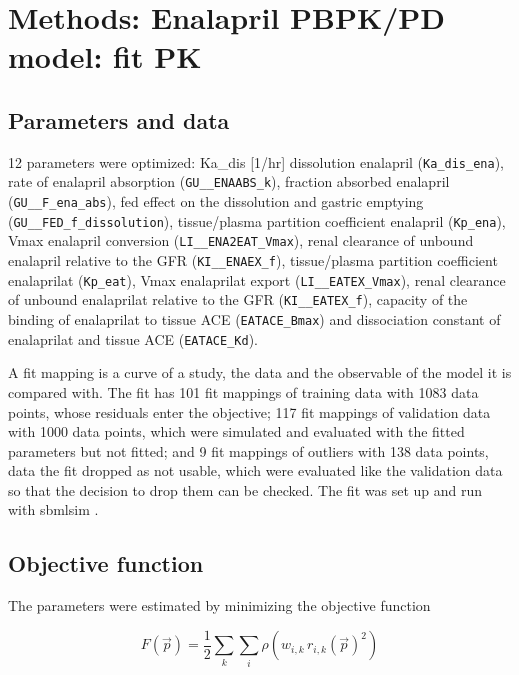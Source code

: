 \section{Methods: Enalapril PBPK/PD model: fit PK}

\subsection{Parameters and data}

12 parameters were optimized: Ka\_dis [1/hr] dissolution enalapril (\texttt{Ka\_dis\_ena}), rate of enalapril absorption (\texttt{GU\_\_ENAABS\_k}), fraction absorbed enalapril (\texttt{GU\_\_F\_ena\_abs}), fed effect on the dissolution and gastric emptying (\texttt{GU\_\_FED\_f\_dissolution}), tissue/plasma partition coefficient enalapril (\texttt{Kp\_ena}), Vmax enalapril conversion (\texttt{LI\_\_ENA2EAT\_Vmax}), renal clearance of unbound enalapril relative to the GFR (\texttt{KI\_\_ENAEX\_f}), tissue/plasma partition coefficient enalaprilat (\texttt{Kp\_eat}), Vmax enalaprilat export (\texttt{LI\_\_EATEX\_Vmax}), renal clearance of unbound enalaprilat relative to the GFR (\texttt{KI\_\_EATEX\_f}), capacity of the binding of enalaprilat to tissue ACE (\texttt{EATACE\_Bmax}) and dissociation constant of enalaprilat and tissue ACE (\texttt{EATACE\_Kd}).

A fit mapping is a curve of a study, the data and the observable of the model it is compared with. The fit has 101 fit mappings of training data with 1083 data points, whose residuals enter the objective; 117 fit mappings of validation data with 1000 data points, which were simulated and evaluated with the fitted parameters but not fitted; and 9 fit mappings of outliers with 138 data points, data the fit dropped as not usable, which were evaluated like the validation data so that the decision to drop them can be checked. The fit was set up and run with sbmlsim \cite{Koenig2026_sbmlsim}.

\subsection{Objective function}

The parameters were estimated by minimizing the objective function

\begin{equation}
F(\vec{p}) = \frac{1}{2} \sum_{k} \sum_{i} \rho\left(w_{i,k}\, r_{i,k}(\vec{p})^2\right)
\end{equation}

